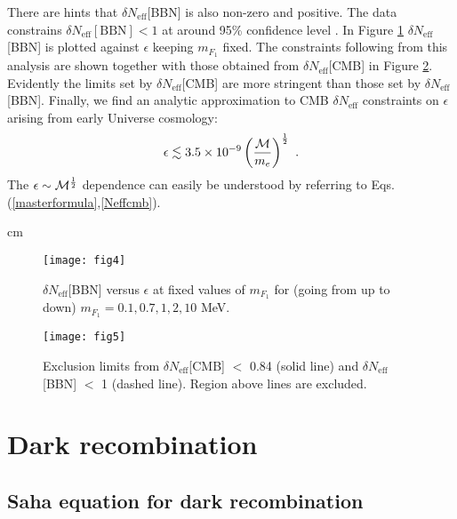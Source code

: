 \documentclass[12pt]{article}
\begin{document}
There are hints that $\delta N _{\text{eff}}$[BBN] is also non-zero and positive. The data constrains $\delta N _{\text{eff}}[\text{BBN}] < 1$ at around 95\% confidence level \cite{izotov}. In Figure \ref{fig:Neffbbnmf1} $\delta N _{\text{eff}}$[BBN] is plotted against $\epsilon$ keeping $m _{F_1}$ fixed. The constraints following from this analysis are shown together with those obtained from $\delta N _{\text{eff}}$[CMB] in Figure \ref{fig:Comparison bbn cmb}. Evidently the limits set by $\delta N _{\text{eff}}$[CMB] are more stringent than those set by $\delta N _{\text{eff}}$[BBN]. Finally, we find an analytic approximation to CMB $\delta N _{\text{eff}}$ constraints on $\epsilon$ arising from early Universe cosmology:
%
\begin{eqnarray}
\epsilon \lesssim 3.5 \times 10 ^{-9} \left ( \frac{{\cal M}}{m _e} \right ) ^{\frac{1}{2}} \ .
\label{constraints}
\end{eqnarray}
%
The $\epsilon \sim {\cal M} ^{\frac{1}{2}}$ dependence can easily be understood by referring to Eqs.(\ref{masterformula},\ref{Neffcmb}).

 cm
%
\begin{figure}[htpb]
    \centering
        \texttt{[image: fig4]}
    \caption{$\delta N _{\text{eff}}$[BBN] versus $\epsilon$ at fixed values of $m_{F_1}$ for (going from up to down) $m _{F_1} = 0.1, 0.7, 1, 2, 10$ MeV.}
    \label{fig:Neffbbnmf1}
\end{figure}
%
\begin{figure}[htpb]
    \centering
        \texttt{[image: fig5]}
    \caption{Exclusion limits from $\delta N _{\text{eff}}$[CMB] $<$ 0.84 (solid line) and $\delta N _{\text{eff}}$[BBN] $<$ 1 (dashed line). Region above lines are excluded.}
    \label{fig:Comparison bbn cmb}
\end{figure}
%

\newpage

\section{Dark recombination}

\subsection{Saha equation for dark recombination}
\end{document}
